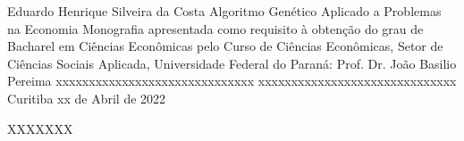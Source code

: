 \documentclass[a4paper,12pt,openright,oneside]{book}
\begin{document}

\folhatermoaprovacao
	{Eduardo Henrique Silveira da Costa}
	{Algoritmo Genético Aplicado a Problemas na Economia}
	{Monografia apresentada como requisito à obtenção do grau de Bacharel em Ciências Econômicas pelo Curso de Ciências Econômicas, Setor de Ciências Sociais Aplicada, Universidade Federal do Paraná:}
	{Prof. Dr. João Basilio Pereima}
	{xxxxxxxxxxxxxxxxxxxxxxxxxxxxxx}
	{xxxxxxxxxxxxxxxxxxxxxxxxxxxxxx}
	{Curitiba}
	{xx de Abril de 2022}

\agradecimentos
	{XXXXXXX}
\end{document}
